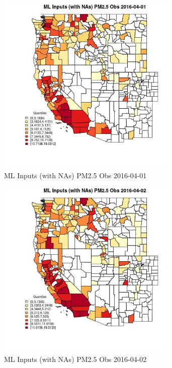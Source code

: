 \begin{figure} 
\centering  
\includegraphics[width=0.77\textwidth]{Code_Outputs/Report_ML_input_PM25_Step4_part_e_de_duplicated_aveswNAs_CountyPM25_ObsMean2016-04-01_2016-04-01.jpg} 
\caption{\label{fig:Report_ML_input_PM25_Step4_part_e_de_duplicated_aveswNAsCountyPM25_ObsMean2016-04-01_2016-04-01}ML Inputs (with NAs) PM2.5 Obs 2016-04-01} 
\end{figure} 
 

\begin{figure} 
\centering  
\includegraphics[width=0.77\textwidth]{Code_Outputs/Report_ML_input_PM25_Step4_part_e_de_duplicated_aveswNAs_CountyPM25_ObsMean2016-04-02_2016-04-02.jpg} 
\caption{\label{fig:Report_ML_input_PM25_Step4_part_e_de_duplicated_aveswNAsCountyPM25_ObsMean2016-04-02_2016-04-02}ML Inputs (with NAs) PM2.5 Obs 2016-04-02} 
\end{figure} 
 

